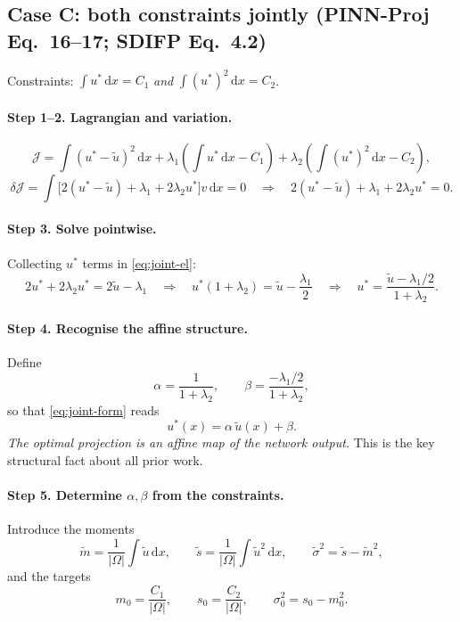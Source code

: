 \documentclass[11pt,a4paper]{article}
\theoremstyle{remark}
\newcommand{\dx}{\,\mathrm{d}x}
\newcommand{\ut}{\tilde{u}}
\newcommand{\us}{u^{*}}
\newcommand{\Om}{\Omega}
\begin{document}
\subsection{Case C: both constraints jointly (PINN-Proj Eq.~16--17; SDIFP Eq.~4.2)}

Constraints: $\displaystyle\int\us\dx = C_1$ \emph{and} $\displaystyle\int(\us)^2\dx = C_2$.

\paragraph{Step 1--2. Lagrangian and variation.}
\begin{equation}
\mathcal{J} = \int(\us-\ut)^2\dx
+ \lambda_1\left(\int\us\dx - C_1\right)
+ \lambda_2\left(\int(\us)^2\dx - C_2\right),
\end{equation}
\begin{equation}
\delta\mathcal{J}
= \int\Big[2(\us-\ut) + \lambda_1 + 2\lambda_2\us\Big]v\dx = 0
\quad\Longrightarrow\quad
2(\us-\ut) + \lambda_1 + 2\lambda_2\us = 0 .
\label{eq:joint-el}
\end{equation}

\paragraph{Step 3. Solve pointwise.}
Collecting $\us$ terms in \eqref{eq:joint-el}:
\begin{equation}
2\us + 2\lambda_2\us = 2\ut - \lambda_1
\quad\Longrightarrow\quad
\us(1+\lambda_2) = \ut - \frac{\lambda_1}{2}
\quad\Longrightarrow\quad
\us = \frac{\ut - \lambda_1/2}{1+\lambda_2}.
\label{eq:joint-form}
\end{equation}

\paragraph{Step 4. Recognise the affine structure.}
Define
\begin{equation}
\alpha = \frac{1}{1+\lambda_2}, \qquad
\beta = \frac{-\lambda_1/2}{1+\lambda_2},
\end{equation}
so that \eqref{eq:joint-form} reads
\begin{equation}
\us(x) = \alpha\,\ut(x) + \beta .
\label{eq:affine}
\end{equation}
\emph{The optimal projection is an affine map of the network output.} This is the
key structural fact about all prior work.

\paragraph{Step 5. Determine $\alpha,\beta$ from the constraints.}
Introduce the moments
\begin{equation}
\tilde m = \frac{1}{|\Om|}\int \ut \dx, \qquad
\tilde s = \frac{1}{|\Om|}\int \ut^2 \dx, \qquad
\tilde\sigma^2 = \tilde s - \tilde m^2,
\end{equation}
and the targets
\begin{equation}
m_0 = \frac{C_1}{|\Om|}, \qquad
s_0 = \frac{C_2}{|\Om|}, \qquad
\sigma_0^2 = s_0 - m_0^2 .
\end{equation}
\end{document}
